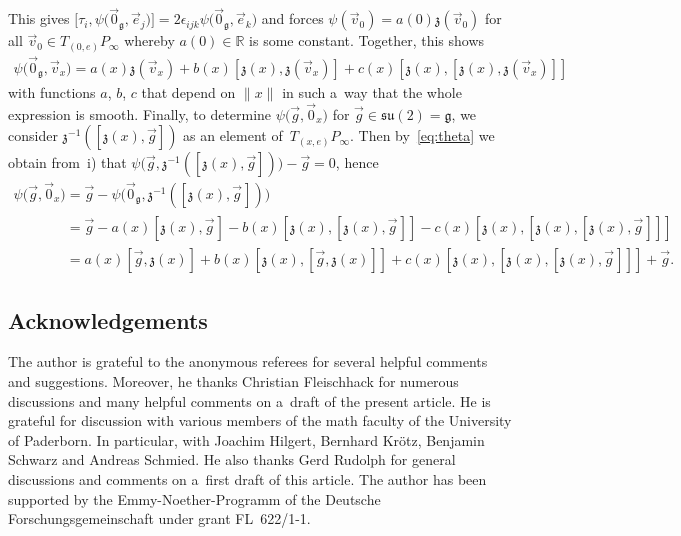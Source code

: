 \documentclass[pdftex]{sigma}
\numberwithin{equation}{section}
\begin{document}
This gives
$\big[\tau_i,\psi\big(\vec{0}_{\mathfrak{g}},\vec{e}_j\big)\big]=2\epsilon_{ijk}\psi\big(\vec{0}_{\mathfrak{g}},\vec{e}_k\big)$
and forces $\psi(\vec{v}_0)=a(0){\mathfrak{z}}(\vec{v}_0)$ for all $\vec{v}_0\in T_{(0,e)}P_\infty$ whereby $a(0)\in \mathbb{R}$ is
some constant.
Together, this shows
\begin{gather*}
\psi\big(\vec{0}_{\mathfrak{g}},\vec{v}_x\big)=a(x){\mathfrak{z}}(\vec{v}_x)+b(x)[{\mathfrak{z}}(x),{\mathfrak{z}}(\vec{v}_x)]+c(x)[{\mathfrak{z}}(x),[{\mathfrak{z}}(x),{\mathfrak{z}}(\vec{v}_x)]]
\end{gather*}
with functions $a$, $b$, $c$ that depend on $\|x\|$ in such a~way that the whole expression is smooth.
Finally, to determine $\psi\big(\vec{g},\vec{0}_x\big)$ for $\vec{g}\in \mathfrak{su}(2)=\mathfrak{g}$, we consider
${\mathfrak{z}}^{-1}([{\mathfrak{z}}(x),\vec{g}])$ as an element of~$T_{(x,e)}P_\infty$.
Then by~\eqref{eq:theta} we obtain from~i) that $\psi\big(\vec{g},{\mathfrak{z}}^{-1}([{\mathfrak{z}}(x),\vec{g}])\big)-\vec{g}=0$,
hence
\begin{gather*}
\psi\big(\vec{g},\vec{0}_x\big)=\vec{g}-\psi\big(\vec{0}_{\mathfrak{g}},{\mathfrak{z}}^{-1}([{\mathfrak{z}}(x),\vec{g}\hspace{1pt}])\big)
\\
\phantom{\psi\big(\vec{g},\vec{0}_x\big)}
=\vec{g}-a(x)[{\mathfrak{z}}(x),\vec{g}\hspace{1pt}]-b(x)[{\mathfrak{z}}(x),[{\mathfrak{z}}(x),\vec{g}\hspace{1pt}]]-c(x)[{\mathfrak{z}}(x),[{\mathfrak{z}}(x),[{\mathfrak{z}}(x),\vec{g}\hspace{1pt}]]]
\\
\phantom{\psi\big(\vec{g},\vec{0}_x\big)}
=a(x)[\vec{g},{\mathfrak{z}}(x)]+b(x)[{\mathfrak{z}}(x),[\vec{g},{\mathfrak{z}}(x)]]+c(x)[{\mathfrak{z}}(x),[{\mathfrak{z}}(x),[{\mathfrak{z}}(x),\vec{g}\hspace{1pt}]]]+\vec{g}.
\end{gather*}

\subsection*{Acknowledgements} The author is grateful to the anonymous referees for several helpful comments and
suggestions.
Moreover, he thanks Christian Fleischhack for numerous discussions and many helpful comments on a~draft of the present
article.
He is grateful for discussion with various members of the math faculty of the University of Paderborn.
In particular, with Joachim Hilgert, Bernhard Kr\"{o}tz, Benjamin Schwarz and Andreas Schmied.
He also thanks Gerd Rudolph for general discussions and comments on a~f\/irst draft of this article.
The author has been supported by the Emmy-Noether-Programm of the Deutsche Forschungsgemeinschaft under grant
FL~622/1-1.
\end{document}
